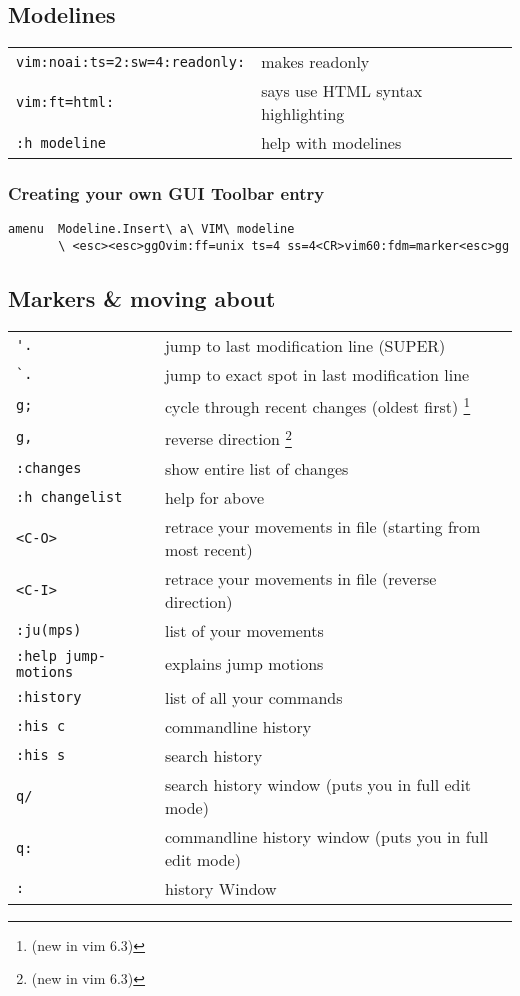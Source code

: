 \subsection{Modelines}
\begin{center}
\begin{longtable}{l|l}
 \verb!vim:noai:ts=2:sw=4:readonly:! & makes readonly\\
 \verb!vim:ft=html:! & says use HTML syntax highlighting\\
 \verb!:h modeline! & help with modelines
\end{longtable}
\end{center}

\subsubsection{Creating your own GUI Toolbar entry}

\begin{verbatim}
amenu  Modeline.Insert\ a\ VIM\ modeline
       \ <esc><esc>ggOvim:ff=unix ts=4 ss=4<CR>vim60:fdm=marker<esc>gg
\end{verbatim}

\subsection{Markers \& moving about}
\begin{center}
\begin{longtable}{l|l}
 \verb!'.! & jump to last modification line (SUPER)\\
 \verb!`.! & jump to exact spot in last modification line\\
 \verb!g;! & cycle through recent changes (oldest first) \footnote{(new in vim 6.3)}\\
 \verb!g,! & reverse direction \footnote{(new in vim 6.3)}\\
 \verb!:changes! & show entire list of changes\\
 \verb!:h changelist! & help for above\\
 \verb!<C-O>! & retrace your movements in file (starting from most recent)\\
 \verb!<C-I>! & retrace your movements in file (reverse direction)\\
 \verb!:ju(mps)! & list of your movements\\
 \verb!:help jump-motions! & explains jump motions\\
 \verb!:history! & list of all your commands\\
 \verb!:his c! & commandline history\\
 \verb!:his s! & search history\\
 \verb!q/! & search history window (puts you in full edit mode)\\
 \verb!q:! & commandline history window (puts you in full edit mode)\\
 \verb!:! & history Window
 \end{longtable}
\end{center}

